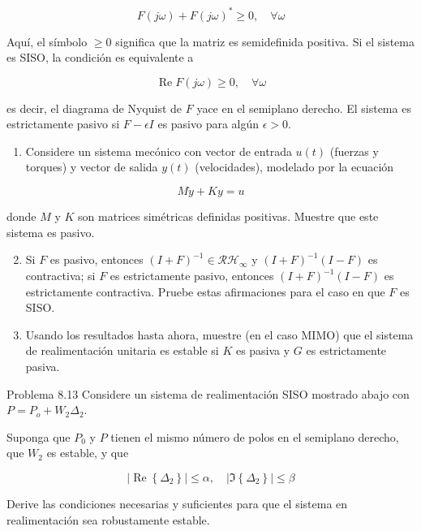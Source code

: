 $$
F(j \omega)+F(j \omega)^{*} \geq 0, \quad \forall \omega
$$

Aquí, el símbolo $\geq 0$ significa que la matriz es semidefinida positiva. Si el sistema es SISO, la condición es equivalente a

$$
\operatorname{Re} F(j \omega) \geq 0, \quad \forall \omega
$$

es decir, el diagrama de Nyquist de $F$ yace en el semiplano derecho. El sistema es estrictamente pasivo si $F-\epsilon I$ es pasivo para algún $\epsilon>0$.

\begin{enumerate}
  \item Considere un sistema mecónico con vector de entrada $u(t)$ (fuerzas y torques) y vector de salida $y(t)$ (velocidades), modelado por la ecuación
\end{enumerate}

$$
M \dot{y}+K y=u
$$

donde $M$ y $K$ son matrices simétricas definidas positivas. Muestre que este sistema es pasivo.

\begin{enumerate}
  \setcounter{enumi}{1}
  \item Si $F$ es pasivo, entonces $(I+F)^{-1} \in \mathcal{R} \mathcal{H}_{\infty}$ y $(I+F)^{-1}(I-F)$ es contractiva; si $F$ es estrictamente pasivo, entonces $(I+F)^{-1}(I-F)$ es estrictamente contractiva. Pruebe estas afirmaciones para el caso en que $F$ es SISO.
  \item Usando los resultados hasta ahora, muestre (en el caso MIMO) que el sistema de realimentación unitaria es estable si $K$ es pasiva y $G$ es estrictamente pasiva.
\end{enumerate}

Problema 8.13 Considere un sistema de realimentación SISO mostrado abajo con $P=P_{o}+W_{2} \Delta_{2}$.


Suponga que $P_{0}$ y $P$ tienen el mismo número de polos en el semiplano derecho, que $W_{2}$ es estable, y que

$$
\left|\operatorname{Re}\left\{\Delta_{2}\right\}\right| \leq \alpha, \quad\left|\Im\left\{\Delta_{2}\right\}\right| \leq \beta
$$

Derive las condiciones necesarias y suficientes para que el sistema en realimentación sea robustamente estable.

